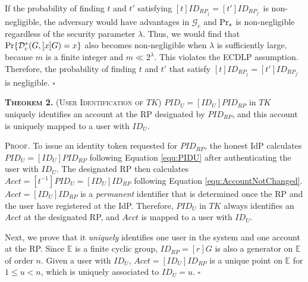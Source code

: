 
If the probability of finding $t$ and $t'$ satisfying $[t]ID_{RP_j} = [t']ID_{RP_{j'}}$ is non-negligible,
    the adversary would have advantages  in $\mathcal{G}_c$ and ${\rm Pr}_s$ is non-negligible regardless of the security parameter $\lambda$.
Thus, we would find that ${\rm Pr}\{\mathcal{D}^*_c(G, [x]G)=x\}$ also becomes non-negligible  when $\lambda$ is sufficiently large, because $m$ is a finite integer and $m \ll 2^\lambda$.
\oldc
This violates the ECDLP assumption. Therefore, the probability of finding $t$ and $t'$ that satisfy $[t]ID_{RP_j} = [t']ID_{RP_{j'}}$ is negligible. \hfill $\square$


\newc
\vspace{2mm}
\noindent\textsc{\textbf{Theorem 2.} (User Identification of $TK$)} { $PID_U= [ID_U]PID_{RP}$ in $TK$ uniquely identifies an account at the RP designated by $PID_{RP}$, and this account is uniquely mapped to a user with $ID_U$.}


\vspace{0.75mm}
\noindent\textsc{Proof.}
To issue an identity token requested for $PID_{RP}$, the honest IdP calculates $PID_U = [ID_U]PID_{RP}$ following Equation \ref{equ:PIDU} after authenticating the user with $ID_U$. The designated RP then calculates $Acct = [t^{-1}]PID_{U} = [ID_U]ID_{RP}$ following Equation \ref{equ:AccountNotChanged}.
$Acct = [ID_U]ID_{RP}$ is a \emph{permanent} identifier that is determined once the RP and the user have registered at the IdP. Therefore, $PID_U$ in $TK$ always identifies an $Acct$ at the designated RP, and $Acct$ is mapped to a user with $ID_U$.

Next, we prove that it \emph{uniquely} identifies one user in the system and one account at the RP. Since $\mathbb{E}$ is a finite cyclic group, $ID_{RP} = [r]G$ is also a generator on $\mathbb{E}$ of order $n$. Given a user with $ID_U$, $Acct = [ID_U]ID_{RP}$ is a unique point on $\mathbb{E}$ for $1 \leq u < n$, which is uniquely associated to $ID_U=u$. \hfill $\square$

